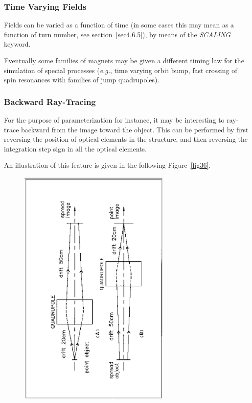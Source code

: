 \subsubsection{Time Varying Fields} \label{sec4.6.TimeVFields} 

Fields can be varied as a function of time  (in some cases this may mean as a function of turn number, 
see section~\ref{sec4.6.5}), by means of the  \textsl{SCALING} keyword. 

\medskip

\noindent Eventually some families of magnets may be given a different timing law 
    for the simulation of special processes (\emph{e.g.}, time varying orbit bump, 
fast crossing of spin resonances with families of jump quadrupoles). 


\subsubsection{Backward Ray-Tracing} \label{sec4.6.3} 
 

For the purpose of parameterization for instance, it may be interesting to ray-trace 
backward  from the image toward the object.  This can be performed by first 
reversing the position of optical elements in the structure, and then 
reversing the integration step sign in all the optical elements.  
\medskip

\noindent An illustration of this feature is given in the following
Figure~\ref{fig36}.    


\begin{figure}[H]
\centerline{\includegraphics[height=12cm,angle=-90]{Fig36.ps}}
\end{figure}


